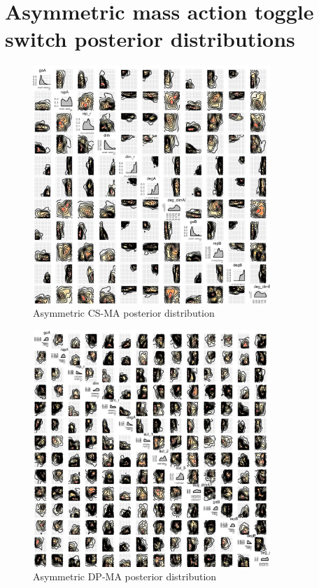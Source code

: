 \section{Asymmetric mass action toggle switch posterior distributions}



\begin{figure}[htbp]
	\centerfloat
	\includegraphics[width=0.8\textwidth]{../../appendices/posterior-CS-asym}
	\caption[Asymmetric CS-MA posterior distribution]{Asymmetric CS-MA posterior distribution}
	\label{fig:apend_cs_post_asym}
\end{figure}

\begin{figure}[htbp]
	\centerfloat
	\includegraphics[width=0.8\textwidth]{../../appendices/posterior-DP-asym}
	\caption[Asymmetric DP-MA posterior distribution]{Asymmetric DP-MA posterior distribution}
	\label{fig:apend_cs_post_asym}
\end{figure}
\clearpage